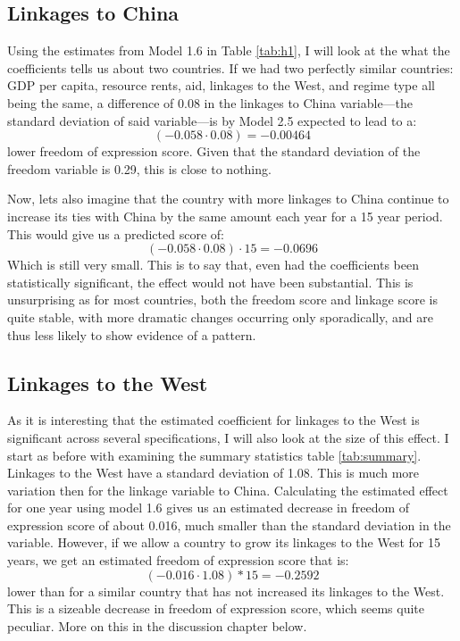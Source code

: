 \subsection{Linkages to China}
Using the estimates from Model 1.6 in Table \ref{tab:h1}, I will look at the what the coefficients tells us about two countries. If we had two perfectly similar countries: GDP per capita, resource rents, aid, linkages to the West, and regime type all being the same, a difference of 0.08 in the linkages to China variable---the standard deviation of said variable---is by Model 2.5 expected to lead to a:
\begin{equation*}
    (-0.058 \cdot 0.08) = -0.00464
\end{equation*}
lower freedom of expression score. Given that the standard deviation of the freedom variable is 0.29, this is close to nothing.

Now, lets also imagine that the country with more linkages to China continue to increase its ties with China by the same amount each year for a 15 year period. This would give us a predicted score of:
\begin{equation*}
    (-0.058 \cdot 0.08)\cdot 15 = -0.0696
\end{equation*}
Which is still very small. This is to say that, even had the coefficients been statistically significant, the effect would not have been substantial. This is unsurprising as for most countries, both the freedom score and linkage score is quite stable, with more dramatic changes occurring only sporadically, and are thus less likely to show evidence of a pattern.

\subsection{Linkages to the West} \label{sec:west_coefficients}
As it is interesting that the estimated coefficient for linkages to the West is significant across several specifications, I will also look at the size of this effect. I start as before with examining the summary statistics table \ref{tab:summary}. Linkages to the West have a standard deviation of 1.08. This is much more variation then for the linkage variable to China. Calculating the estimated effect for one year using model 1.6 gives us an estimated decrease in freedom of expression score of about 0.016, much smaller than the standard deviation in the variable. However, if we allow a country to grow its linkages to the West for 15 years, we get an estimated freedom of expression score that is:
\begin{equation*}
    (-0.016 \cdot 1.08)*15 = -0.2592
\end{equation*}
lower than for a similar country that has not increased its linkages to the West. This is a sizeable decrease in freedom of expression score, which seems quite peculiar. More on this in the discussion chapter below. 

